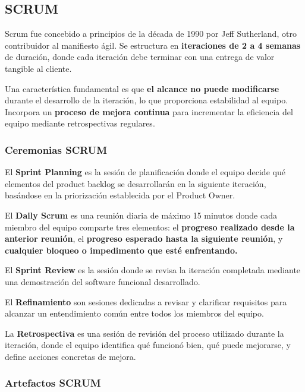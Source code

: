 \documentclass[a4paper,11pt]{report}
\begin{document}
    \subsection{SCRUM}\label{subsec:scrum}

    Scrum fue concebido a principios de la década de 1990 por Jeff Sutherland, otro contribuidor al manifiesto ágil.
    Se estructura en \textbf{iteraciones de 2 a 4 semanas} de duración, donde cada iteración debe terminar con una entrega de valor tangible al cliente.

    Una característica fundamental es que \textbf{el alcance no puede modificarse} durante el desarrollo de la iteración, lo que proporciona estabilidad al equipo.
    Incorpora un \textbf{proceso de mejora continua} para incrementar la eficiencia del equipo mediante retrospectivas regulares.


    \subsubsection{Ceremonias SCRUM}

    El \textbf{Sprint Planning} es la sesión de planificación donde el equipo decide qué elementos del product backlog se desarrollarán en la siguiente iteración, basándose en la priorización establecida por el Product Owner.

    El \textbf{Daily Scrum} es una reunión diaria de máximo 15 minutos donde cada miembro del equipo comparte tres elementos: el \textbf{progreso realizado desde la anterior reunión}, el \textbf{progreso esperado hasta la siguiente reunión}, y \textbf{cualquier bloqueo o impedimento que esté enfrentando.}

    El \textbf{Sprint Review} es la sesión donde se revisa la iteración completada mediante una demostración del software funcional desarrollado.

    El \textbf{Refinamiento} son sesiones dedicadas a revisar y clarificar requisitos para alcanzar un entendimiento común entre todos los miembros del equipo.

    La \textbf{Retrospectiva} es una sesión de revisión del proceso utilizado durante la iteración, donde el equipo identifica qué funcionó bien, qué puede mejorarse, y define acciones concretas de mejora.



    \subsubsection{Artefactos SCRUM}
\end{document}
